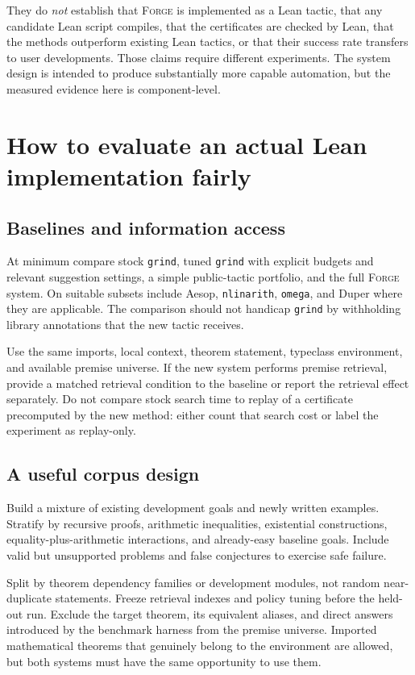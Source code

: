 \documentclass[11pt,a4paper]{article}
\theoremstyle{definition}
\newcommand{\forge}{\textsc{Forge}}
\newcommand{\grind}{\texttt{grind}}
\newcommand{\code}[1]{\texttt{#1}}
\begin{document}
They do \emph{not} establish that \forge{} is implemented as a Lean tactic, that any candidate Lean script compiles, that the certificates are checked by Lean, that the methods outperform existing Lean tactics, or that their success rate transfers to user developments. Those claims require different experiments. The system design is intended to produce substantially more capable automation, but the measured evidence here is component-level.

\section{How to evaluate an actual Lean implementation fairly}

\subsection{Baselines and information access}

At minimum compare stock \grind{}, tuned \grind{} with explicit budgets and relevant suggestion settings, a simple public-tactic portfolio, and the full \forge{} system. On suitable subsets include Aesop, \code{nlinarith}, \code{omega}, and Duper where they are applicable. The comparison should not handicap \grind{} by withholding library annotations that the new tactic receives.

Use the same imports, local context, theorem statement, typeclass environment, and available premise universe. If the new system performs premise retrieval, provide a matched retrieval condition to the baseline or report the retrieval effect separately. Do not compare stock search time to replay of a certificate precomputed by the new method: either count that search cost or label the experiment as replay-only.

\subsection{A useful corpus design}

Build a mixture of existing development goals and newly written examples. Stratify by recursive proofs, arithmetic inequalities, existential constructions, equality-plus-arithmetic interactions, and already-easy baseline goals. Include valid but unsupported problems and false conjectures to exercise safe failure.

Split by theorem dependency families or development modules, not random near-duplicate statements. Freeze retrieval indexes and policy tuning before the held-out run. Exclude the target theorem, its equivalent aliases, and direct answers introduced by the benchmark harness from the premise universe. Imported mathematical theorems that genuinely belong to the environment are allowed, but both systems must have the same opportunity to use them.
\end{document}
